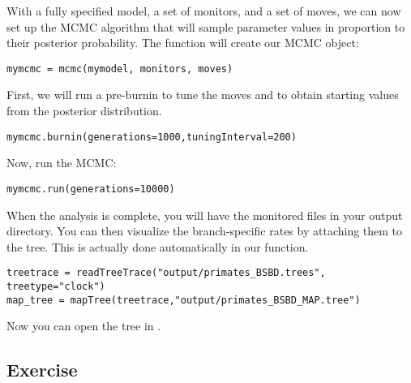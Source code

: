 With a fully specified model, a set of monitors, and a set of moves, we can now set up the MCMC algorithm that will sample parameter values in proportion to their posterior probability.
The  function will create our MCMC object:
{\tt \begin{snugshade*}
\begin{lstlisting}
mymcmc = mcmc(mymodel, monitors, moves)
\end{lstlisting}
\end{snugshade*}}

First, we will run a pre-burnin to tune the moves and to obtain starting values from the posterior distribution.
{\tt \begin{snugshade*}
\begin{lstlisting}
mymcmc.burnin(generations=1000,tuningInterval=200)
\end{lstlisting}
\end{snugshade*}}

Now, run the MCMC:
{\tt \begin{snugshade*}
\begin{lstlisting}
mymcmc.run(generations=10000)
\end{lstlisting}
\end{snugshade*}}

When the analysis is complete, you will have the monitored files in your output directory.
You can then visualize the branch-specific rates by attaching them to the tree.
This is actually done automatically in our  function.
{\tt \begin{snugshade*}
\begin{lstlisting}
treetrace = readTreeTrace("output/primates_BSBD.trees", treetype="clock")
map_tree = mapTree(treetrace,"output/primates_BSBD_MAP.tree")
\end{lstlisting}
\end{snugshade*}}
Now you can open the tree in \FigTree.




\subsection{Exercise}

